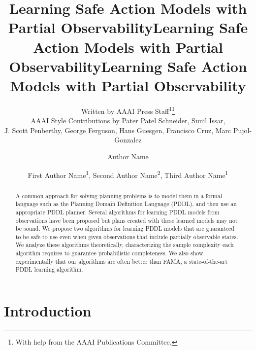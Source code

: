 \documentclass[letterpaper]{article} %
\title{Learning Safe Action Models with Partial Observability}
\author{
    Written by AAAI Press Staff\textsuperscript{\rm 1}\thanks{With help from the AAAI Publications Committee.}\\
    AAAI Style Contributions by Pater Patel Schneider,
    Sunil Issar,\\
    J. Scott Penberthy,
    George Ferguson,
    Hans Guesgen,
    Francisco Cruz\equalcontrib,
    Marc Pujol-Gonzalez\equalcontrib
}
\title{Learning Safe Action Models with Partial Observability}
\author {
    Author Name
}
\title{Learning Safe Action Models with Partial Observability}
\author {
    First Author Name\textsuperscript{\rm 1},
    Second Author Name\textsuperscript{\rm 2},
    Third Author Name\textsuperscript{\rm 1}
}
\begin{document}
\maketitle

\begin{abstract}
A common approach for solving planning problems is to model them in a formal language such as the Planning Domain Definition Language (PDDL), and then use an appropriate PDDL planner. 
Several algorithms for learning PDDL models from observations have been proposed but plans created with these learned models may not be sound. 
We propose two algorithms for learning PDDL models that are guaranteed to be safe to use even when given observations that include partially observable states. 
We analyze these algorithms theoretically, characterizing the sample complexity each algorithm requires to guarantee probabilistic completeness. 
We also show experimentally that our algorithms are often better than FAMA, a state-of-the-art PDDL learning algorithm. 
\end{abstract}

















\section{Introduction} 
\end{document}
